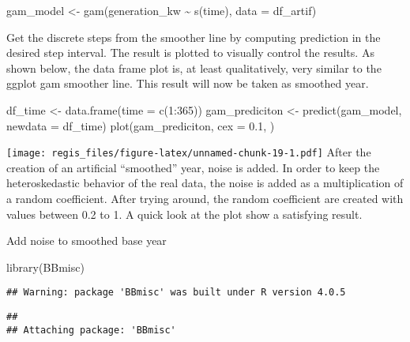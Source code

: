 \documentclass[
]{article}
\newenvironment{Shaded}{\begin{snugshade}}{\end{snugshade}}
\newcommand{\AttributeTok}[1]{\textcolor[rgb]{0.77,0.63,0.00}{#1}}
\newcommand{\DecValTok}[1]{\textcolor[rgb]{0.00,0.00,0.81}{#1}}
\newcommand{\FloatTok}[1]{\textcolor[rgb]{0.00,0.00,0.81}{#1}}
\newcommand{\FunctionTok}[1]{\textcolor[rgb]{0.00,0.00,0.00}{#1}}
\newcommand{\NormalTok}[1]{#1}
\newcommand{\OtherTok}[1]{\textcolor[rgb]{0.56,0.35,0.01}{#1}}
\newcommand{\SpecialCharTok}[1]{\textcolor[rgb]{0.00,0.00,0.00}{#1}}
\begin{document}
\begin{Shaded}
\begin{Highlighting}[]
\NormalTok{gam\_model }\OtherTok{\textless{}{-}} \FunctionTok{gam}\NormalTok{(generation\_kw }\SpecialCharTok{\textasciitilde{}} \FunctionTok{s}\NormalTok{(time), }\AttributeTok{data =}\NormalTok{ df\_artif)}
\end{Highlighting}
\end{Shaded}

Get the discrete steps from the smoother line by computing prediction in
the desired step interval. The result is plotted to visually control the
results. As shown below, the data frame plot is, at least qualitatively,
very similar to the ggplot gam smoother line. This result will now be
taken as smoothed year.

\begin{Shaded}
\begin{Highlighting}[]
\NormalTok{df\_time }\OtherTok{\textless{}{-}} \FunctionTok{data.frame}\NormalTok{(}\AttributeTok{time =} \FunctionTok{c}\NormalTok{(}\DecValTok{1}\SpecialCharTok{:}\DecValTok{365}\NormalTok{))}
\NormalTok{gam\_prediciton }\OtherTok{\textless{}{-}} \FunctionTok{predict}\NormalTok{(gam\_model, }\AttributeTok{newdata =}\NormalTok{ df\_time)}
\FunctionTok{plot}\NormalTok{(gam\_prediciton, }\AttributeTok{cex =} \FloatTok{0.1}\NormalTok{, )}
\end{Highlighting}
\end{Shaded}

\texttt{[image: regis\_files/figure-latex/unnamed-chunk-19-1.pdf]} After
the creation of an artificial ``smoothed'' year, noise is added. In
order to keep the heteroskedastic behavior of the real data, the noise
is added as a multiplication of a random coefficient. After trying
around, the random coefficient are created with values between 0.2 to 1.
A quick look at the plot show a satisfying result.

Add noise to smoothed base year

\begin{Shaded}
\begin{Highlighting}[]
\FunctionTok{library}\NormalTok{(BBmisc)}
\end{Highlighting}
\end{Shaded}

\begin{verbatim}
## Warning: package 'BBmisc' was built under R version 4.0.5
\end{verbatim}

\begin{verbatim}
## 
## Attaching package: 'BBmisc'
\end{verbatim}
\end{document}
